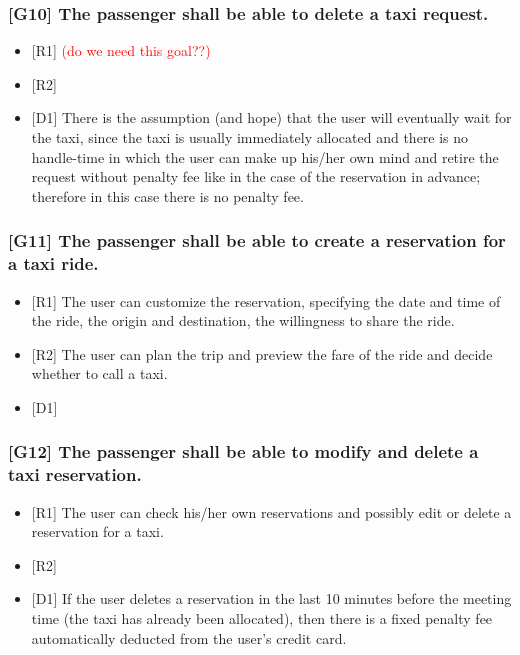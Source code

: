 \documentclass[a4paper,11pt]{report} %
\begin{document}
	\subsubsection{{[}G10{]} The passenger shall be able to delete a taxi request.}
	\begin{itemize}
		\item {[}R1{]} \textcolor{red}{(do we need this goal??)}
		\item {[}R2{]}
		\item {[}D1{]} There is the assumption (and hope) that the user will eventually wait for the taxi, since the taxi is usually immediately allocated and there is no handle-time in which the user can make up his/her own mind and retire the request without penalty fee like in the case of the reservation in advance; therefore in this case there is no penalty fee.
	\end{itemize}
	
	\subsubsection{{[}G11{]} The passenger shall be able to create a reservation for a taxi ride.}
	\begin{itemize}
		\item {[}R1{]} The user can customize the reservation, specifying the date and time of the ride, the origin and destination, the willingness to share the ride.
		\item {[}R2{]} The user can plan the trip and preview the fare of the ride and decide whether to call a taxi.
		\item {[}D1{]}
	\end{itemize}
	
	\subsubsection{{[}G12{]} The passenger shall be able to modify and delete a taxi reservation.}
	\begin{itemize}
		\item {[}R1{]} The user can check his/her own reservations and possibly edit or delete a reservation for a taxi.
		\item {[}R2{]}
		\item {[}D1{]} If the user deletes a reservation in the last 10 minutes before the meeting time (the taxi has already been allocated), then there is a fixed penalty fee automatically deducted from the user's credit card.
	\end{itemize}
	
\end{document}
